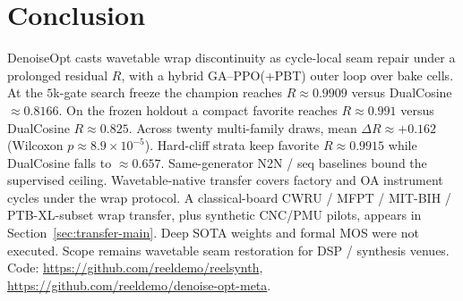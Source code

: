\section{Conclusion}
\label{sec:conclusion}

DenoiseOpt casts wavetable wrap discontinuity as cycle-local seam repair under a prolonged residual $R$, with a hybrid GA--PPO(+PBT) outer loop over bake cells.
At the $5$k-gate search freeze the champion reaches $R\approx 0.9909$ versus DualCosine $\approx 0.8166$.
On the frozen holdout a compact favorite reaches $R\approx 0.991$ versus DualCosine $R\approx 0.825$.
Across twenty multi-family draws, mean $\Delta R\approx{+}0.162$ (Wilcoxon $p\approx 8.9{\times}10^{-5}$).
Hard-cliff strata keep favorite $R\approx 0.9915$ while DualCosine falls to $\approx 0.657$.
Same-generator N2N / seq baselines bound the supervised ceiling.
Wavetable-native transfer covers factory and OA instrument cycles under the wrap protocol.
A classical-board CWRU / MFPT / MIT-BIH / PTB-XL-subset wrap transfer, plus synthetic CNC/PMU pilots, appears in Section~\ref{sec:transfer-main}.
Deep SOTA weights and formal MOS were not executed.
Scope remains wavetable seam restoration for DSP / synthesis venues.
Code: \url{https://github.com/reeldemo/reelsynth}, \url{https://github.com/reeldemo/denoise-opt-meta}.
